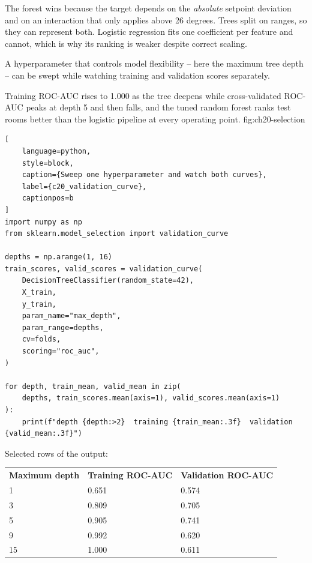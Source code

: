 The forest wins because the target depends on the \emph{absolute} setpoint
deviation and on an interaction that only applies above 26 degrees. Trees split
on ranges, so they can represent both. Logistic regression fits one coefficient
per feature and cannot, which is why its ranking is weaker despite correct
scaling.


A hyperparameter that controls model flexibility -- here the maximum tree depth
-- can be swept while watching training and validation scores separately.

{Training ROC-AUC rises to 1.000 as the tree deepens while cross-validated ROC-AUC peaks at depth 5 and then falls, and the tuned random forest ranks test rooms better than the logistic pipeline at every operating point.}
{fig:ch20-selection}

\begin{lstlisting}[
    language=python,
    style=block,
    caption={Sweep one hyperparameter and watch both curves},
    label={c20_validation_curve},
    captionpos=b
]
import numpy as np
from sklearn.model_selection import validation_curve

depths = np.arange(1, 16)
train_scores, valid_scores = validation_curve(
    DecisionTreeClassifier(random_state=42),
    X_train,
    y_train,
    param_name="max_depth",
    param_range=depths,
    cv=folds,
    scoring="roc_auc",
)

for depth, train_mean, valid_mean in zip(
    depths, train_scores.mean(axis=1), valid_scores.mean(axis=1)
):
    print(f"depth {depth:>2}  training {train_mean:.3f}  validation {valid_mean:.3f}")
\end{lstlisting}

Selected rows of the output:

\begin{center}
\begin{tabular}{lll}
\textbf{Maximum depth} & \textbf{Training ROC-AUC} & \textbf{Validation ROC-AUC} \\
1 & 0.651 & 0.574 \\
3 & 0.809 & 0.705 \\
5 & 0.905 & 0.741 \\
9 & 0.992 & 0.620 \\
15 & 1.000 & 0.611 \\
\end{tabular}
\end{center}

